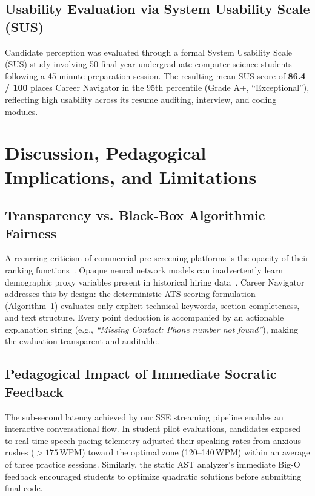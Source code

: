 \documentclass[conference]{IEEEtran}
\begin{document}
\subsection{Usability Evaluation via System Usability Scale (SUS)}
Candidate perception was evaluated through a formal System Usability Scale (SUS) study involving 50 final-year undergraduate computer science students following a 45-minute preparation session. The resulting mean SUS score of \textbf{86.4 / 100} places Career Navigator in the 95th percentile (Grade A+, ``Exceptional''), reflecting high usability across its resume auditing, interview, and coding modules.

\section{Discussion, Pedagogical Implications, and Limitations}

\subsection{Transparency vs. Black-Box Algorithmic Fairness}
A recurring criticism of commercial pre-screening platforms is the opacity of their ranking functions~\cite{oneil2021weapons}. Opaque neural network models can inadvertently learn demographic proxy variables present in historical hiring data~\cite{patel2023mitigating, mujtaba2024fairness}. Career Navigator addresses this by design: the deterministic ATS scoring formulation (Algorithm~1) evaluates only explicit technical keywords, section completeness, and text structure. Every point deduction is accompanied by an actionable explanation string (e.g., \textit{``Missing Contact: Phone number not found''}), making the evaluation transparent and auditable.

\subsection{Pedagogical Impact of Immediate Socratic Feedback}
The sub-second latency achieved by our SSE streaming pipeline enables an interactive conversational flow. In student pilot evaluations, candidates exposed to real-time speech pacing telemetry adjusted their speaking rates from anxious rushes ($> 175$\,WPM) toward the optimal zone (120--140\,WPM) within an average of three practice sessions. Similarly, the static AST analyzer's immediate Big-O feedback encouraged students to optimize quadratic solutions before submitting final code.
\end{document}
